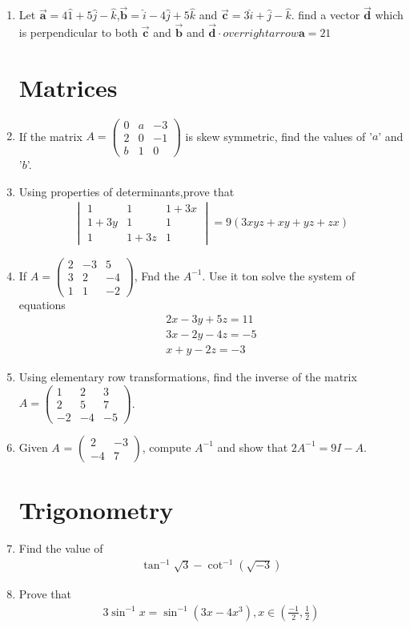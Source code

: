 \documentclass[10pt,-letter paper]{article}
\providecommand{\brak}[1]{\ensuremath{\left(#1\right)}}
\newcommand{\myvec}[1]{\ensuremath{\begin{pmatrix}#1\end{pmatrix}}}
\newcommand{\mydet}[1]{\ensuremath{\begin{vmatrix}#1\end{vmatrix}}}
\begin{document}
\begin{enumerate}
\item Let $\overrightarrow{\mathbf{a}}=4\hat{1}+5\hat{j}-\hat{k}$,$\overrightarrow{\mathbf{b}}=\hat{i}-4\hat{j}+5\hat{k}$ and $\overrightarrow{\mathbf{c}}=3\hat{i}+\hat{j}-\hat{k}$. find a vector $\overrightarrow{\mathbf{d}}$ which is perpendicular to both $\overrightarrow{\mathbf{c}}$ and $\overrightarrow{\mathbf{b}}$ and $\overrightarrow{\mathbf{d}}\cdot overrightarrow{\mathbf{a}}=21$

\section{Matrices}

\item  If the matrix $A = \myvec{ 0 & a & -3 \\ 2 & 0 & -1 \\ b & 1 & 0 }$ is skew symmetric, find the values of '$a$' and '$b$'.

\item Using properties of determinants,prove that 
  \begin{align*}
    \mydet{1 & 1 & 1+3x \\ 1+3y & 1 & 1 \\ 1 & 1+3z & 1 }=9\brak{3xyz+xy+yz+zx}
  \end{align*}
\item If $A=\myvec{2 & -3 & 5 \\ 3 & 2 & -4 \\ 1 & 1 & -2}$, Fnd the $A^{-1}$. Use it ton solve the system of equations 
  \begin{align*}
    2x-3y+5z=11 \\
    3x-2y-4z=-5\\
    x+y-2z=-3
  \end{align*}
\item Using elementary row transformations, find the inverse of the matrix $A=\myvec{1 & 2 & 3 \\ 2 & 5 & 7 \\ -2 & -4 & -5}$.
\item Given $A$ = $\myvec{ 2 & -3 \\ -4 & 7 }$, compute $A^{-1}$ and show that $2A^{-1} = 9I-A$.
\section{Trigonometry}

\item Find the value of
  \begin{align*}
    \tan^{-1}\sqrt{3}-\cot^{-1}\brak{\sqrt{-3}}
  \end{align*}
 \item Prove that 
      \begin{align*}
    3\sin^{-1}x=\sin^{-1}\brak{3x-4x^3}, x\in\brak{\frac{-1}{2},\frac{1}{2}}
      \end{align*} 

\end{enumerate}
\end{document}
